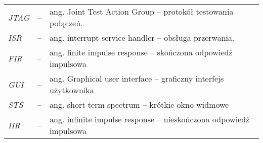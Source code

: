 \begin{tabular}{lcl}
	\textit{JTAG} & -- & ang. Joint Test Action Group -- protokół testowania połączeń. \\
	\textit{ISR} & -- & ang. interrupt service handler -- obsługa przerwania. \\
  \textit{FIR} & -- & ang. finite impulse response -- skończona odpowiedź impulsowa \\
	\textit{GUI} & -- & ang. Graphical user interface -- graficzny interfejs użytkownika \\
  \textit{STS} & -- & ang. short term spectrum -- krótkie okno widmowe \\
	\textit{IIR} & -- & ang. infinite impulse response -- nieskończona odpowiedź impulsowa \\
\end{tabular} 
